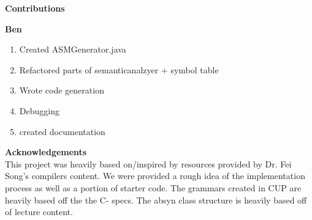 \documentclass[12pt]{extarticle}
\begin{document}
\textbf{Contributions}

\begin{multicols}{2}
\textbf{Ben}
\begin{enumerate}
    \item Created ASMGenerator.java
    \item Refactored parts of semanticanalzyer + symbol table
    \item Wrote code generation
    \item Debugging
    \item created documentation
\end{enumerate}
\columnbreak
\end{multicols}

\vspace{0.5cm}

\textbf{Acknowledgements} \\
This project was heavily based on/inspired by resources provided by Dr. Fei Song's compilers content. We were provided a rough idea of the implementation process as well as a portion of starter code. The grammars created in CUP are heavily based off the the C- specs. The absyn class structure is heavily based off of lecture content.
\end{document}
